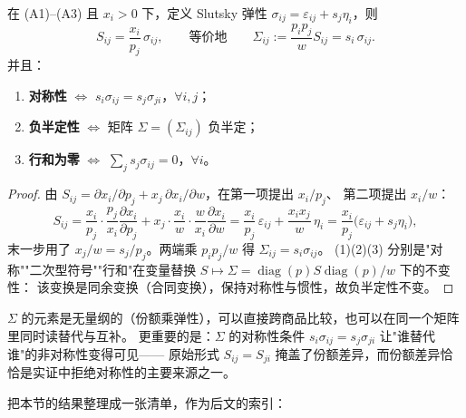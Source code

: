 \begin{proposition}\label{prop:S-elasticity}
在 (A1)--(A3) 且 $x_i>0$ 下，定义 Slutsky 弹性 $\sigma_{ij}=\varepsilon_{ij}+s_j\eta_i$，则
\[
 S_{ij}=\frac{x_i}{p_j}\,\sigma_{ij},
 \qquad\text{等价地}\qquad
 \Sigma_{ij}:=\frac{p_ip_j}{w}S_{ij}=s_i\,\sigma_{ij}.
\]
并且：
\begin{enumerate}
\item \textbf{对称性} $\iff$ $s_i\sigma_{ij}=s_j\sigma_{ji}$，$\forall i,j$；
\item \textbf{负半定性} $\iff$ 矩阵 $\Sigma=(\Sigma_{ij})$ 负半定；
\item \textbf{行和为零} $\iff$ $\sum_j s_j\sigma_{ij}=0$，$\forall i$。
\end{enumerate}
\end{proposition}

\begin{proof}
由 $S_{ij}=\partial x_i/\partial p_j+x_j\,\partial x_i/\partial w$，在第一项提出 $x_i/p_j$、
第二项提出 $x_i/w$：
\[
 S_{ij}=\frac{x_i}{p_j}\cdot\frac{p_j}{x_i}\frac{\partial x_i}{\partial p_j}
 +x_j\cdot\frac{x_i}{w}\cdot\frac{w}{x_i}\frac{\partial x_i}{\partial w}
 =\frac{x_i}{p_j}\,\varepsilon_{ij}+\frac{x_ix_j}{w}\,\eta_i
 =\frac{x_i}{p_j}\bigl(\varepsilon_{ij}+s_j\eta_i\bigr),
\]
末一步用了 $x_j/w=s_j/p_j$。两端乘 $p_ip_j/w$ 得 $\Sigma_{ij}=s_i\sigma_{ij}$。
(1)(2)(3) 分别是"对称""二次型符号""行和"在变量替换 $S\mapsto\Sigma=\operatorname{diag}(p)S\operatorname{diag}(p)/w$ 下的不变性：
该变换是同余变换（合同变换），保持对称性与惯性，故负半定性不变。
\end{proof}

\begin{remark}
$\Sigma$ 的元素是无量纲的（份额乘弹性），可以直接跨商品比较，也可以在同一个矩阵里同时读替代与互补。
更重要的是：$\Sigma$ 的对称性条件 $s_i\sigma_{ij}=s_j\sigma_{ji}$ 让"谁替代谁"的非对称性变得可见——
原始形式 $S_{ij}=S_{ji}$ 掩盖了份额差异，而份额差异恰恰是实证中拒绝对称性的主要来源之一。
\end{remark}

把本节的结果整理成一张清单，作为后文的索引：

